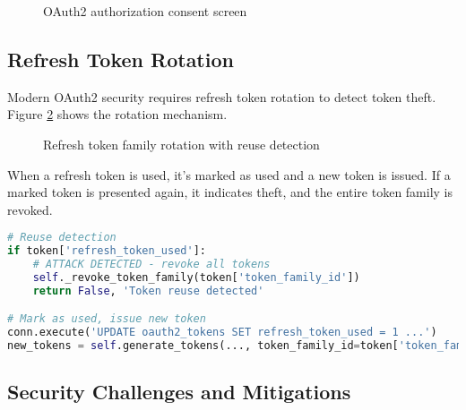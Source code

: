 \documentclass[12pt,a4paper]{article}
\begin{document}
\begin{figure}[H]
    \centering
    \caption{OAuth2 authorization consent screen}
    \label{fig:oauth_consent}
\end{figure}

\subsection{Refresh Token Rotation}

Modern OAuth2 security requires refresh token rotation to detect token theft. Figure \ref{fig:token_rotation} shows the rotation mechanism.

\begin{figure}[H]
    \centering
    
    \caption{Refresh token family rotation with reuse detection}
    \label{fig:token_rotation}
\end{figure}

When a refresh token is used, it's marked as used and a new token is issued. If a marked token is presented again, it indicates theft, and the entire token family is revoked.

\begin{lstlisting}[language=Python]
# Reuse detection
if token['refresh_token_used']:
    # ATTACK DETECTED - revoke all tokens
    self._revoke_token_family(token['token_family_id'])
    return False, 'Token reuse detected'

# Mark as used, issue new token
conn.execute('UPDATE oauth2_tokens SET refresh_token_used = 1 ...')
new_tokens = self.generate_tokens(..., token_family_id=token['token_family_id'])
\end{lstlisting}

\subsection{Security Challenges and Mitigations}
\end{document}
